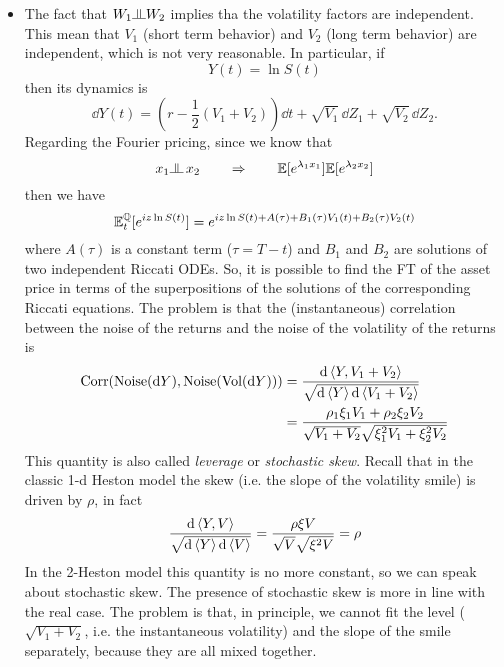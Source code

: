 \begin{itemize}
    \item The fact that $W_1 \indep W_2$ implies tha the volatility factors are independent. This mean that $V_1$ (short term behavior) and $V_2$ (long term behavior) are independent, which is not very reasonable. In particular, if
    \begin{equation*}
        Y(t) = \ln S(t)
    \end{equation*}
    then its dynamics is
    \begin{equation*}
        \dd Y(t) = \left(r-\frac{1}{2}(V_1+V_2)\right)\dd t + \sqrt{V_1}\,\dd Z_1 + \sqrt{V_2}\,\dd Z_2.
    \end{equation*}
    Regarding the Fourier pricing, since we know that
    \begin{equation*}
        x_1 \indep\, x_2 \qquad\Rightarrow\qquad \mathbb{E}[e^{\lambda_1x_1}]\mathbb{E}[e^{\lambda_2x_2}]
    \end{equation*}
    then we have
    \begin{equation*}
        \mathbb{E}^{\mathbb{Q}}_t[e^{iz\ln S(t)}] = e^{iz\ln S(t) + A(\tau) + B_1(\tau)V_1(t) + B_2(\tau)V_2(t)}
    \end{equation*}
    where $A(\tau)$ is a constant term ($\tau = T-t$) and $B_1$ and $B_2$ are solutions of two independent Riccati ODEs. So, it is possible to find the FT of the asset price in terms of the superpositions of the solutions of the corresponding Riccati equations. The problem is that the (instantaneous) correlation between the noise of the returns and the noise of the volatility of the returns is
    \begin{align*}
        \text{Corr}(\text{Noise}(\dd Y), \text{Noise}(\text{Vol}(\dd Y))) &= \frac{\dd\expval{Y,V_1+V_2}}{\sqrt{\dd\expval{Y}\dd\expval{V_1+V_2}}} \\
        &=
        \frac{\rho_1\xi_1V_1+\rho_2\xi_2V_2}{\sqrt{V_1+V_2}\sqrt{\xi_1^2V_1 + \xi_2^2V_2}}
    \end{align*}
    This quantity is also called \emph{leverage} or \emph{stochastic skew}. Recall that in the classic 1-d Heston model the skew (i.e. the slope of the volatility smile) is driven by $\rho$, in fact
    \begin{equation*}
        \frac{\dd\expval{Y,V}}{\sqrt{\dd\expval{Y}\dd\expval{V}}} = \frac{\rho\xi V}{\sqrt{V}\sqrt{\xi^2 V}} = \rho
    \end{equation*}
    In the 2-Heston model this quantity is no more constant, so we can speak about stochastic skew. The presence of stochastic skew is more in line with the real case. The problem is that, in principle, we cannot fit the level ($\sqrt{V_1+V_2}$, i.e. the instantaneous volatility) and the slope of the smile separately, because they are all mixed together.
\end{itemize}
